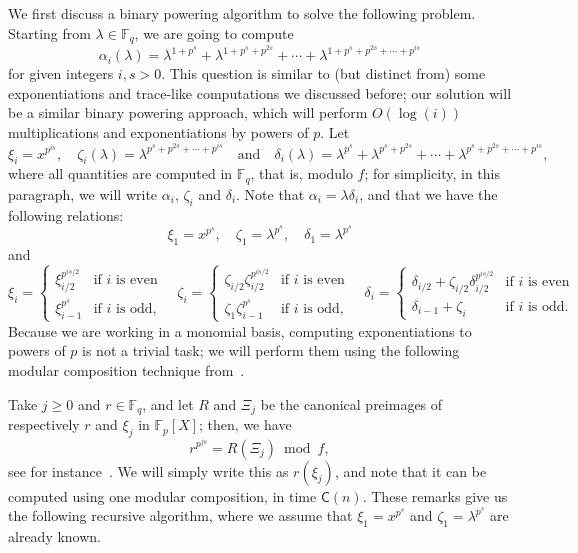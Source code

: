 \documentclass[12pt]{article}
\theoremstyle{plain}
\theoremstyle{definition}
\def\F{\mathbb{F}}
\def\CC{\mathsf{C}}
\newcounter{algorithm}
\begin{document}
We first discuss a binary powering algorithm to solve the following
problem. Starting from $\lambda \in \F_q$, we are going to compute
$$
\alpha_i(\lambda) = \lambda^{1 + p^s} + \lambda^{1 + p^s + p^{2s}} + \cdots + \lambda^{1 + p^s + p^{2s} + \cdots + p^{is}}
$$ for given integers $i, s > 0$. This question is similar to (but
distinct from) some exponentiations and trace-like computations we
discussed before; our solution will be a similar binary powering 
approach, which will perform $O(\log(i))$ multiplications and
exponentiations by powers of $p$. Let
$$
\xi_i = x^{p^{is}},
\quad 
\zeta_i(\lambda) = \lambda^{p^s + p^{2s} + \cdots + p^{is}} 
\quad\text{and}\quad 
\delta_i(\lambda) = \lambda^{p^s} + \lambda^{p^s + p^{2s}} + \cdots + \lambda^{p^s + p^{2s} + \cdots + p^{is}},
$$ where all quantities are computed in $\F_q$, that is, modulo $f$;
for simplicity, in this paragraph, we will write $\alpha_i$, $\zeta_i$
and $\delta_i$. Note that $\alpha_i=\lambda \delta_i$, and that we
have the following relations:
$$\xi_1 = x^{p^s}, \quad \zeta_1 = \lambda^{p^s}, \quad \delta_1 = \lambda^{p^s}$$
and
$$
\xi_i =
\begin{cases}
\xi_{i / 2}^{p^{is / 2}} & \text{if $i$ is even}  \\
\xi_{i - 1}^{p^s} & \text{if $i$ is odd,}
\end{cases} \quad
\zeta_i = 
\begin{cases}
\zeta_{i / 2}\zeta_{i / 2}^{p^{is / 2}} & \text{if $i$ is even}  \\
\zeta_1\zeta_{i - 1}^{p^s} & \text{if $i$ is odd,}
\end{cases} \quad
\delta_i = 
\begin{cases}
\delta_{i / 2} + \zeta_{i / 2}\delta_{i / 2}^{p^{is / 2}} & \text{if $i$ is even}  \\
\delta_{i-1} + \zeta_i & \text{if $i$ is odd.}
\end{cases}$$
Because we are working in a monomial basis, computing exponentiations
to powers of $p$ is not a trivial task; we will perform them using the
following modular composition technique from~\cite{GaSh92}.

Take $j \ge 0$ and $r\in \F_q$, and let $R$ and $\Xi_j$ be the
canonical preimages of respectively $r$ and $\xi_j$ in $\F_p[X]$;
then, we have
$$r^{p^{js}} = R(\Xi_j) \bmod f,$$ see for instance~\cite[Chapter
  14.7]{GaGe03}. We will simply write this as $r(\xi_j)$, and note
that it can be computed using one modular composition, in time
$\CC(n)$. These remarks give us the following recursive algorithm,
where we assume that $\xi_1=x^{p^s}$ and $\zeta_1=\lambda^{p^s}$ are already
known.
\end{document}
